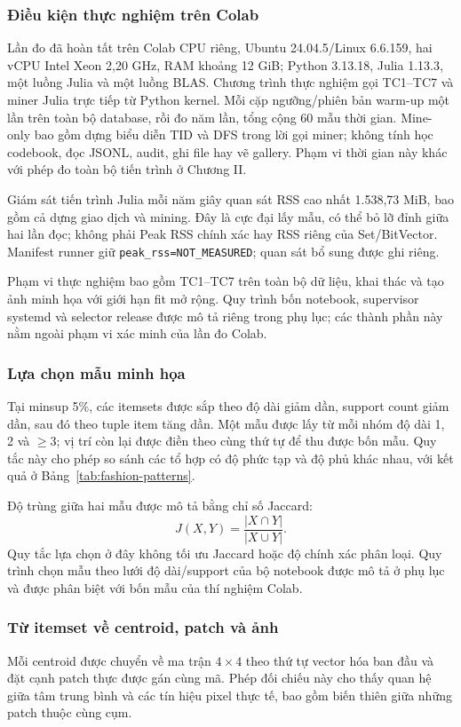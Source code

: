 \subsubsection{Điều kiện thực nghiệm trên Colab}

Lần đo đã hoàn tất trên Colab CPU riêng, Ubuntu 24.04.5/Linux 6.6.159,
hai vCPU Intel Xeon 2,20 GHz, RAM khoảng 12 GiB; Python 3.13.18,
Julia 1.13.3, một luồng Julia và một luồng BLAS. Chương trình thực nghiệm
gọi TC1--TC7 và miner Julia trực tiếp từ Python kernel. Mỗi cặp
ngưỡng/phiên bản warm-up một lần trên toàn bộ database, rồi đo năm lần,
tổng cộng 60 mẫu thời gian. Mine-only bao gồm dựng biểu diễn TID và DFS
trong lời gọi miner; không tính học codebook, đọc JSONL, audit, ghi file
hay vẽ gallery. Phạm vi thời gian này khác với phép đo toàn bộ tiến
trình ở Chương II.

Giám sát tiến trình Julia mỗi năm giây quan sát RSS cao nhất
1.538,73 MiB, bao gồm cả dựng giao dịch và mining. Đây là cực đại lấy
mẫu, có thể bỏ lỡ đỉnh giữa hai lần đọc; không phải Peak RSS chính xác
hay RSS riêng của Set/BitVector. Manifest runner giữ
\texttt{peak\_rss=NOT\_MEASURED}; quan sát bổ sung được ghi riêng.

Phạm vi thực nghiệm bao gồm TC1--TC7 trên toàn bộ dữ liệu, khai thác và
tạo ảnh minh họa với giới hạn fit mở rộng. Quy trình bốn notebook,
supervisor systemd và selector release được mô tả riêng trong phụ lục;
các thành phần này nằm ngoài phạm vi xác minh của lần đo Colab.

\subsubsection{Lựa chọn mẫu minh họa}
Tại minsup 5\%, các itemsets được sắp theo độ dài giảm dần, support
count giảm dần, sau đó theo tuple item tăng dần. Một mẫu được lấy từ
mỗi nhóm độ dài 1, 2 và $\geq3$; vị trí còn lại được điền theo cùng thứ
tự để thu được bốn mẫu. Quy tắc này cho phép so sánh các tổ hợp có độ
phức tạp và độ phủ khác nhau, với kết quả ở
Bảng~\ref{tab:fashion-patterns}.

Độ trùng giữa hai mẫu được mô tả bằng chỉ số Jaccard:
\begin{equation}
J(X,Y)=\frac{|X\cap Y|}{|X\cup Y|}.
\end{equation}
Quy tắc lựa chọn ở đây không tối ưu Jaccard hoặc độ chính xác phân loại.
Quy trình chọn mẫu theo lưới độ dài/support của bộ notebook được mô tả
ở phụ lục và được phân biệt với bốn mẫu của thí nghiệm Colab.

\subsubsection{Từ itemset về centroid, patch và ảnh}
Mỗi centroid được chuyển về ma trận $4\times4$ theo thứ tự vector hóa
ban đầu và đặt cạnh patch thực được gán cùng mã. Phép đối chiếu này
cho thấy quan hệ giữa tâm trung bình và các tín hiệu pixel thực tế,
bao gồm biến thiên giữa những patch thuộc cùng cụm.

